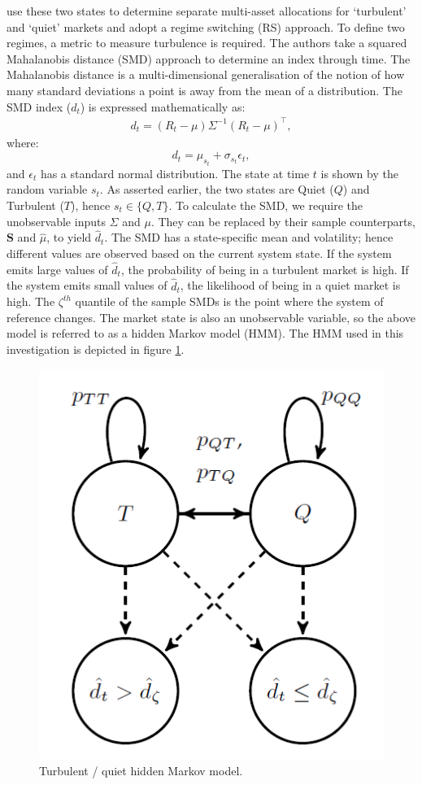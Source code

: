 \documentclass[
]{article}
\begin{document}
\citet{K12} use these two states to determine separate multi-asset allocations for `turbulent' and `quiet'
markets and adopt a regime switching (RS) approach. To define two regimes, a metric to measure
turbulence is required. The authors take a squared Mahalanobis distance (SMD) approach to determine an
index through time. The Mahalanobis distance is a multi-dimensional generalisation of the notion of how
many standard deviations a point is away from the mean of a distribution. The SMD index (\(d_t\)) is
expressed mathematically as:
\begin{align}
d_t = (R_t - \mu)\Sigma^{-1}(R_t - \mu)^\intercal,
\end{align}
where: \[d_t = \mu_{s_t} + \sigma_{s_t}\epsilon_t,\] and \(\epsilon_t\) has a standard normal
distribution. The state at time \(t\) is shown by the random variable \(s_t\). As asserted earlier, the two
states are Quiet (\(Q\)) and Turbulent (\(T\)), hence \(s_t \in \{Q, T\}\). To calculate the SMD, we require
the unobservable inputs \(\Sigma\) and \(\mu\). They can be replaced by their sample counterparts,
\(\textbf{S}\) and \(\hat{\mu}\), to yield \(\hat{d}_t\). The SMD has a state-specific mean and volatility;
hence different values are observed based on the current system state. If the system emits large values
of \(\hat{d}_t\), the probability of being in a turbulent market is high. If the system emits small
values of \(\hat{d}_t\), the likelihood of being in a quiet market is high. The \(\zeta^{th}\) quantile of
the sample SMDs is the point where the system of reference changes. The market state is also an
unobservable variable, so the above model is referred to as a hidden Markov model (HMM). The HMM used
in this investigation is depicted in figure \ref{fig:hmm}.

\begin{figure}

{\centering \includegraphics{quiet_turb_hmm} 

}

\caption{Turbulent / quiet hidden Markov model.}\label{fig:hmm}
\end{figure}
\end{document}
